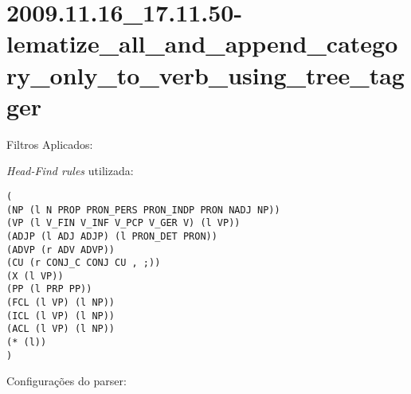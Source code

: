 \section{2009.11.16_17.11.50-lematize_all_and_append_category_only_to_verb_using_tree_tagger} %
\label{sec:exp:2009.11.16_17.11.50-lematize_all_and_append_category_only_to_verb_using_tree_tagger}

Filtros Aplicados:

\begin{itemize}
  
  \item{\emph{LematizeAllAndAppendCategoryOnlyToVerbUsingTreeTagger}
  
\end{itemize}

\emph{Head-Find rules} utilizada:

\scriptsize
\begin{verbatim}
(
(NP (l N PROP PRON_PERS PRON_INDP PRON NADJ NP))
(VP (l V_FIN V_INF V_PCP V_GER V) (l VP))
(ADJP (l ADJ ADJP) (l PRON_DET PRON))
(ADVP (r ADV ADVP))
(CU (r CONJ_C CONJ CU , ;))
(X (l VP))
(PP (l PRP PP))
(FCL (l VP) (l NP))
(ICL (l VP) (l NP))
(ACL (l VP) (l NP))
(* (l))
)

\end{verbatim}

\normalsize

Configurações do parser:

